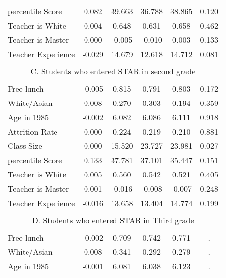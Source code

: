 \documentclass{article}
\begin{document}
\begin{table}[htbp]
\begin{tabular}{llccccc}
    \multicolumn{2}{l}{percentile Score} & 0.082  & 39.663  & 36.788  & 38.865  & 0.120  \\
    \multicolumn{2}{l}{Teacher is White} & 0.004  & 0.648  & 0.631  & 0.658  & 0.462  \\
    \multicolumn{2}{l}{Teacher is Master} & 0.000  & -0.005  & -0.010  & 0.003  & 0.133  \\
    \multicolumn{2}{l}{Teacher Experience} & -0.029  & 14.679  & 12.618  & 14.712  & 0.081  \\
          &       &       &       &       &       &  \\
    \multicolumn{7}{c}{C. Students who entered STAR in second grade} \\
          &       &       &       &       &       &  \\
    \multicolumn{2}{l}{Free lunch} & -0.005  & 0.815  & 0.791  & 0.803  & 0.172  \\
    \multicolumn{2}{l}{White/Asian} & 0.008  & 0.270  & 0.303  & 0.194  & 0.359  \\
    \multicolumn{2}{l}{Age in 1985} & -0.002  & 6.082  & 6.086  & 6.111  & 0.918  \\
    \multicolumn{2}{l}{Attrition Rate} & 0.000  & 0.224  & 0.219  & 0.210  & 0.881  \\
    \multicolumn{2}{l}{Class Size} & 0.000  & 15.520  & 23.727  & 23.981  & 0.027  \\
    \multicolumn{2}{l}{percentile Score} & 0.133  & 37.781  & 37.101  & 35.447  & 0.151  \\
    \multicolumn{2}{l}{Teacher is White} & 0.005  & 0.560  & 0.542  & 0.521  & 0.405  \\
    \multicolumn{2}{l}{Teacher is Master} & 0.001  & -0.016  & -0.008  & -0.007  & 0.248  \\
    \multicolumn{2}{l}{Teacher Experience} & -0.016  & 13.658  & 13.404  & 14.774  & 0.199  \\
          &       &       &       &       &       &  \\
    \multicolumn{7}{c}{D. Students who entered STAR in Third grade} \\
          &       &       &       &       &       &  \\
    \multicolumn{2}{l}{Free lunch} & -0.002  & 0.709  & 0.742  & 0.771  & . \\
    \multicolumn{2}{l}{White/Asian} & 0.008  & 0.341  & 0.292  & 0.279  & . \\
    \multicolumn{2}{l}{Age in 1985} & -0.001  & 6.081  & 6.038  & 6.123  & . \\

\end{tabular}
\end{table}
\end{document}
